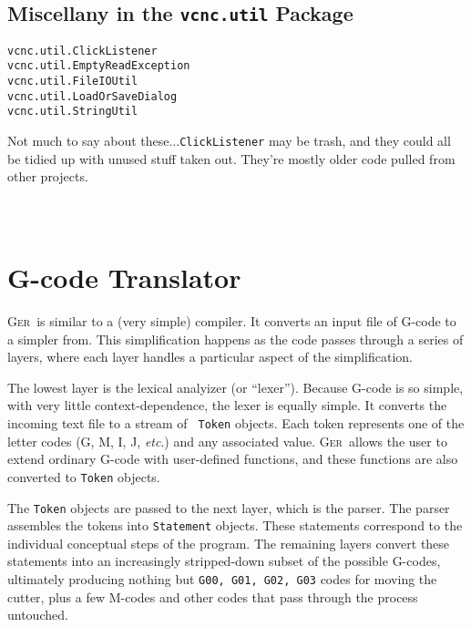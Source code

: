 \documentclass[titlepage,oneside,10pt]{article}
\newcommand{\ger}{\textsc{Ger}}
\begin{document}
\subsection{Miscellany in the {\tt vcnc.util} Package}

\begin{verbatim}
vcnc.util.ClickListener
vcnc.util.EmptyReadException
vcnc.util.FileIOUtil
vcnc.util.LoadOrSaveDialog
vcnc.util.StringUtil
\end{verbatim}

Not much to say about these...{\tt ClickListener} may be trash, and
they could all be tidied up with unused stuff taken out. They're
mostly older code pulled from other projects.

\begin{verbatim}
\end{verbatim}
\begin{verbatim}
\end{verbatim}
\begin{verbatim}
\end{verbatim}

\section{G-code Translator}

\ger\ is similar to a (very simple) compiler. It converts an input
file of G-code to a simpler from. This simplification happens as the
code passes through a series of layers, where each layer handles a
particular aspect of the simplification.

The lowest layer is the lexical analyizer (or ``lexer''). Because
G-code is so simple, with very little context-dependence, the lexer is
equally simple. It converts the incoming text file to a stream of {\tt
  Token} objects. Each token represents one of the letter codes (G, M,
I, J, \emph{etc}.) and any associated value. \ger\ allows the user to
extend ordinary G-code with user-defined functions, and these
functions are also converted to {\tt Token} objects.

The {\tt Token} objects are passed to the next layer, which is the
parser. The parser assembles the tokens into {\tt Statement}
objects. These statements correspond to the individual conceptual
steps of the program. The remaining layers convert these statements
into an increasingly stripped-down subset of the possible
G-codes, ultimately producing nothing but {\tt G00, G01, G02, G03}
codes for moving the cutter, plus a few M-codes and other codes that
pass through the process untouched.
\end{document}
